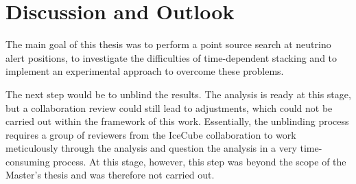 %

\section{Discussion and Outlook}

The main goal of this thesis was to perform a point source search at neutrino alert positions, to investigate the difficulties of time-dependent stacking and to implement an experimental approach to overcome these problems.

The next step would be to unblind the results.
The analysis is ready at this stage, but a collaboration review could still lead to adjustments, which could not be carried out within the framework of this work.
Essentially, the unblinding process requires a group of reviewers from the IceCube collaboration to work meticulously through the analysis and question the analysis in a very time-consuming process.
At this stage, however, this step was beyond the scope of the Master's thesis and was therefore not carried out.

